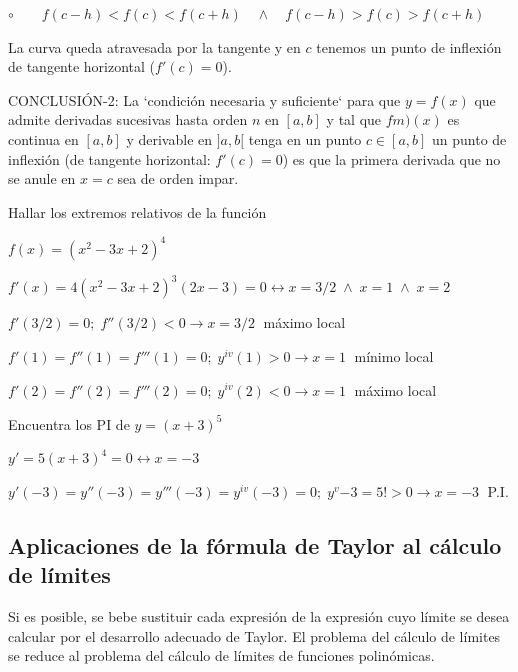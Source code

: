 \begin{itemize}
	
	 $\circ \qquad  f(c-h)<f(c)<f(c+h) \quad \wedge \quad f(c-h)>f(c)>f(c+h)$	
	 
	 La curva queda atravesada por la tangente y en $c$ tenemos un punto de inflexión de tangente horizontal ($f'(c)=0$).
	 
	 \vspace{2mm}CONCLUSIÓN-2: La `condición necesaria y suficiente` para que $y=f(x)$ que admite derivadas sucesivas hasta orden $n$ en $[a,b]$ y tal que $f{m)}(x)$ es continua en $[a,b]$ y derivable en $]a,b[$ tenga en un punto $c \in [a,b]$ un punto de inflexión  (de tangente horizontal: $f'(c)=0$) es que la primera derivada que no se anule en $x=c$ sea de orden impar. 
	 
	 \end{itemize}
	 
	 
	\begin{ejem}
		Hallar los extremos relativos de la función 
		
		$f(x)=(x^2-3x+2)^4$	
			
		$f'(x)=4(x^2-3x+2)^3(2x-3)=0 \leftrightarrow x=3/2 \; \wedge \; x=1 \; \wedge \; x=2 $
		   
		$f'(3/2)=0; \; f''(3/2)<0 \to x=3/2\; $ máximo local
		
		$f'(1)=f''(1)=f'''(1)=0; \; y^{iv}(1)>0 \to x=1\; $ mínimo local
		
		$f'(2)=f''(2)=f'''(2)=0; \; y^{iv}(2)<0 \to x=1\; $ máximo local
		
	\end{ejem}
	
	\begin{ejem} Encuentra los PI de $y=(x+3)^5$
	
	$y'=5(x+3)^4=0 \leftrightarrow x=-3$
	
	$y'(-3)=y''(-3)=y'''(-3)=y^{iv}(-3)=0; \; y^{v}{-3}=5!>0 \to x=-3\; $ P.I.
	
	\end{ejem}
	
	\subsection{Aplicaciones de la fórmula de Taylor al cálculo de límites}

	Si es posible, se bebe sustituir cada expresión de la expresión cuyo límite se desea calcular por el desarrollo adecuado de Taylor. El problema del cálculo de límites se reduce al problema del cálculo de límites de funciones polinómicas.
	
